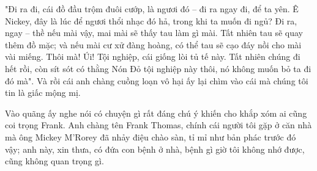 "Đi ra đi, cái đồ đầu trộm đuôi cướp, là ngươi đó – đi ra ngay đi, để ta yên. Ê Nickey, đây là lúc để ngươi thổi nhạc đó hả, trong khi ta muốn đi ngủ? Đi ra, ngay – thề nếu mài vậy, mai mài sẽ thấy tau làm gì mài. Tất nhiên tau sẽ quay thêm đồ mặc; và nếu mài cư xử đàng hoàng, có thể tau sẽ cạo đáy nồi cho mài vài miếng. Thôi mà! Úi! Tội nghiệp, cái giống lòi tủ tế này. Tất nhiên chúng đi hết rồi, còn sít sót có thằng Nón Đỏ tội nghiệp này thôi, nó không muốn bỏ ta đi đó mà". Và rồi cái anh chàng cuồng loạn vô hại ấy lại chìm vào cái mà chúng tôi tin là giấc mộng mị.

Vào quãng ấy nghe nói có chuyện gì rất đáng chú ý khiến cho khắp xóm ai cũng coi trọng Frank. Anh chàng tên Frank Thomas, chính cái người tôi gặp ở căn nhà mà ông Mickey M'Rorey đã nhảy điệu chào sàn, tỉ mỉ như bản phác trước đó vậy; anh này, xin thưa, có đứa con bệnh ở nhà, bệnh gì giờ tôi không nhớ được, cũng không quan trọng gì. 

